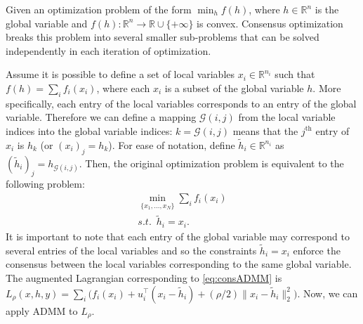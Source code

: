 \documentclass{article}
\DeclareMathOperator*{\argmin}{argmin}
\newcommand{\attn}[1]{\textcolor{red}{TODO: #1}}
\newcommand{\norm}[1]{\left\lVert #1 \right\rVert}
\begin{document}
Given an optimization problem of the form $\min_h f(h)$, where
$h\in\mathbb{R}^n$ is the global variable and
$f(h):\mathbb{R}^n \rightarrow \mathbb{R}\cup \{+\infty\}$ is
convex. Consensus optimization breaks this problem
into several smaller sub-problems that can be solved independently in
each iteration of optimization.  

Assume it is possible to define a set of local variables
$x_i \in \mathbb{R}^{n_i}$ such that $f(h)=\sum_i f_i(x_i)$, where
each $x_i$ is a subset of the global variable $h$. More specifically,
each entry of the local variables corresponds to an entry of the
global variable. Therefore we can define a mapping $\mathscr{G}(i,j)$
from the local variable indices into the global variable indices:
$k=\mathscr{G}(i,j)$ means that the $j^\text{th}$ entry of $x_i$ is
$h_k$ (or $(x_i)_j=h_k$). For ease of notation, define $\tilde{h}_i
\in \mathbb{R}^{n_i}$ as $(\tilde{h}_i)_j=h_{\mathscr{G}(i,j)}$. Then,
the original optimization problem is equivalent to the following
problem:  
\begin{equation}
\begin{aligned}
\min_{\{x_1,...,x_N  \}} \sum_i f_i(x_i)\\
 s.t. \,\,\, \tilde{h}_i=x_i. \,\,\,\,\,\,
\end{aligned}
\label{eq:consADMM}
\end{equation}
It is important to note that each entry of the global variable may
correspond to several entries of the local variables and so the
constraints $\tilde{h}_i=x_i$ enforce the consensus between the local
variables corresponding to the same global variable.  
The augmented Lagrangian corresponding to 
\eqref{eq:consADMM} is $L_\rho(x,h,y)=\sum_i
\big(f_i(x_i)+u_i^\top(x_i-\tilde{h}_i) + (\rho/2) \lVert
x_i-\tilde{h}_i \lVert_2^2 \big)$. Now, we can apply ADMM to $L_\rho$.
\end{document}
